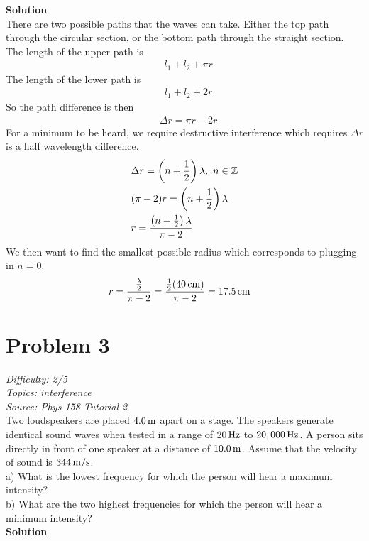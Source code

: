 \documentclass[11pt, fleqn]{article}
\begin{document}
\textbf{Solution}\\
There are two possible paths that the waves can take.
Either the top path through the circular section, or the bottom path through the straight section.\\
The length of the upper path is
\begin{align*}
    &l_1+l_2+\pi r
\end{align*}
The length of the lower path is
\begin{align*}
    &l_1+l_2+2r
\end{align*}
So the path difference is then
\begin{align*}
    &\Delta r=\pi r-2r
\end{align*}
For a minimum to be heard, we require destructive interference which requires $\Delta r$ is a half wavelength difference.
\begin{align*}
    &\Delta r=\left( n+\frac{1}{2} \right)\lambda,\ n\in \mathbb{Z}\\
    &(\pi -2)r=\left( n+\frac{1}{2} \right)\lambda\\
    &r=\frac{\left( n+\frac{1}{2} \right)\lambda}{\pi-2}
\end{align*}
We then want to find the smallest possible radius which corresponds to plugging in $n=0$.
\begin{align*}
    &r=\frac{\frac{\lambda}{2}}{\pi-2}=\frac{\frac{1}{2}(40\,\mathrm{cm})}{\pi-2}=17.5\,\mathrm{cm}
\end{align*}

\section*{Problem 3}
\textit{Difficulty: 2/5}\\
\textit{Topics: interference}\\
\textit{Source: Phys 158 Tutorial 2}\\
Two loudspeakers are placed $4.0\,\mathrm{m}$ apart on a stage. The speakers generate
identical sound waves when tested in a range of $20\,\mathrm{Hz}$ to $20,000\,\mathrm{Hz}$. A person sits 
directly in front of one speaker at a distance of $10.0\,\mathrm{m}$. Assume that the velocity of
sound is $344\,\mathrm{m/s}$.\\
a) What is the lowest frequency for which the person will hear a maximum intensity?\\
b) What are the two highest frequencies for which the person will hear a minimum intensity?\\

\textbf{Solution}
\end{document}
